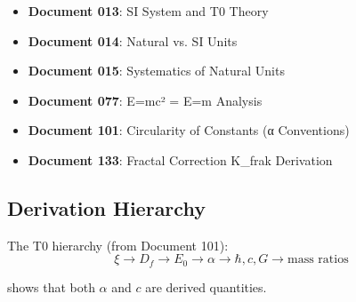	\begin{itemize}
		\item \textbf{Document 013}: SI System and T0 Theory \\

		\item \textbf{Document 014}: Natural vs. SI Units \\

		\item \textbf{Document 015}: Systematics of Natural Units \\

		\item \textbf{Document 077}: E=mc² = E=m Analysis \\

		\item \textbf{Document 101}: Circularity of Constants (α Conventions) \\

		\item \textbf{Document 133}: Fractal Correction K\_frak Derivation \\
		
	\end{itemize}
	
	\subsection{Derivation Hierarchy}
	
	The T0 hierarchy (from Document 101):
	\begin{equation}
		\xi \to D_f \to E_0 \to \alpha \to \hbar, c, G \to \text{mass ratios}
	\end{equation}
	
	shows that both $\alpha$ and $c$ are derived quantities.
